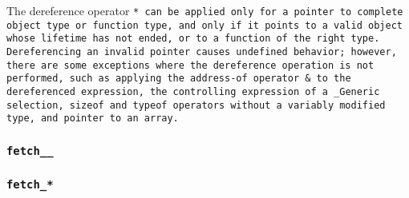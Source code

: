 The dereference operator \tt{*} can be applied only for a pointer to
complete object type or function type, and only if it points to a valid
object whose lifetime has not ended, or to a function of the right type.
Dereferencing an invalid pointer causes undefined behavior; however,
there are some exceptions where the dereference operation is not performed,
such as applying the address-of operator \tt{&} to the dereferenced expression,
the controlling expression of a \tt{_Generic} selection, \tt{sizeof} and
\tt{typeof} operators without a variably modified type, and pointer to an array.

\subsubsection{\tt{fetch__}}


\subsubsection{\tt{fetch_}*}

